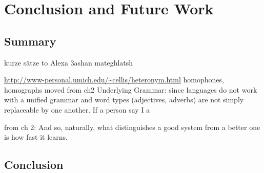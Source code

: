 \chapter{Conclusion and Future Work}
\label{conclusion}
\section{Summary}


kurze sätze to Alexa 3ashan mateghlatsh

\url{http://www-personal.umich.edu/~cellis/heteronym.html}
	homophones, homographs
	moved from ch2 Underlying Grammar: since languages do not work with a unified grammar and word types (adjectives, adverbs) are not simply replaceable by one another. If a person say I a
	
	
	from ch 2:
	And so, naturally, what distinguishes a good system from a better one is how fast it learns.
	
	
	

\section{Conclusion}





